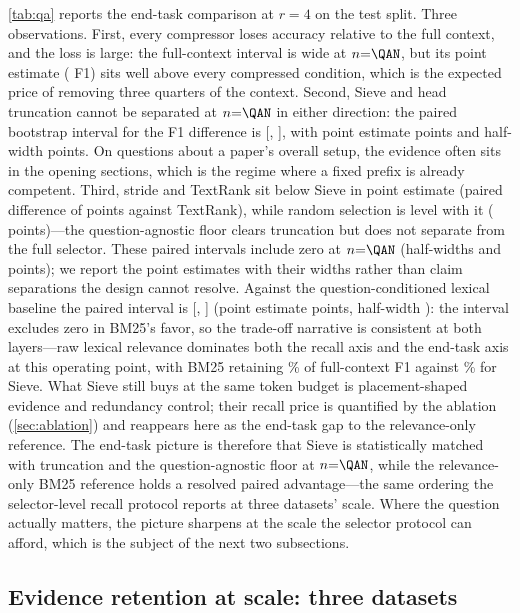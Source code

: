 \documentclass[pdflatex,sn-basic]{sn-jnl}
\theoremstyle{remark}
\newcommand{\method}{Sieve}
\begin{document}
\autoref{tab:qa} reports the end-task comparison at $r=4$ on the test
split. Three observations. First, every compressor loses accuracy
relative to the full context, and the loss is large: the full-context
interval is wide at $n{=}\QAN$, but its point estimate (\QAFullF{} F1)
sits well above every compressed condition, which is the expected
price of removing three quarters of the context. Second, \method{} and
head truncation cannot be separated at $n{=}\QAN$ in either direction:
the paired bootstrap interval for the F1 difference is
[\QAPairSHLo, \QAPairSHHi], with point estimate \QAPairSH{} points
and half-width \QAPairSHHW{} points. On
questions about a paper's overall setup, the evidence often sits in
the opening sections, which is the regime where a fixed prefix is
already competent. Third, stride and TextRank sit below
\method{} in point estimate (paired difference of \QAPairSTR{} points
against TextRank), while random selection is level with it
(\QAPairSRan{} points)---the question-agnostic floor clears truncation
but does not separate from the full selector. These paired intervals
include zero at $n{=}\QAN$ (half-widths \QAPairSTRHW{} and
\QAPairSRanHW{} points); we report the point estimates with their
widths rather than claim separations the design cannot resolve.
\ifdefined\QAPairSBm Against the question-conditioned lexical
baseline the paired interval is
[\QAPairSBmLo, \QAPairSBmHi] (point estimate \QAPairSBm{} points,
half-width \QAPairSBmHW{}): the interval excludes zero in BM25's favor,
so the trade-off narrative is consistent at both layers---raw lexical
relevance dominates both the recall axis and the end-task axis at this
operating point, with BM25 retaining \QABmRetain\% of full-context F1
against \QASieRetain\% for \method{}. What \method{} still buys at the
same token budget is placement-shaped evidence and redundancy control;
their recall price is quantified by the ablation
(\autoref{sec:ablation}) and reappears here as the end-task gap to the
relevance-only reference.
\fi{} The end-task picture is therefore that \method{}
is statistically matched with truncation and the question-agnostic
floor at $n{=}\QAN$, while the relevance-only BM25 reference holds a
resolved paired advantage---the same ordering the selector-level
recall protocol reports at three datasets' scale. Where the question
actually matters, the picture
sharpens at the scale the selector protocol can afford, which is the
subject of the next two subsections.

\subsection{Evidence retention at scale: three datasets}
\label{sec:recall}
\end{document}

